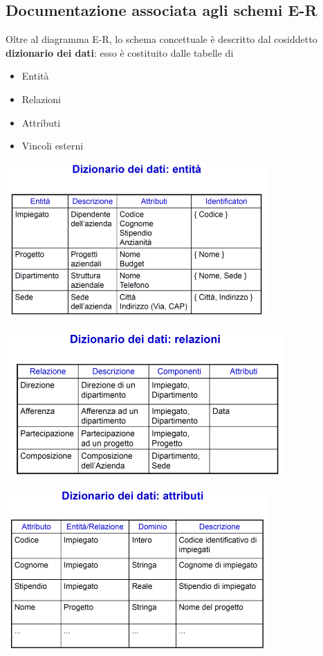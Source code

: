 \documentclass[12pt]{article}
\begin{document}
\subsection{Documentazione associata agli schemi E-R}
Oltre al diagramma E-R, lo schema concettuale è descritto dal cosiddetto \textbf{dizionario dei dati}: esso è costituito dalle tabelle di
\begin{itemize}
    \item Entità
    \item Relazioni 
    \item Attributi 
    \item Vincoli esterni
\end{itemize}
\begin{center}
    \includegraphics[width = 0.75\textwidth]{Images/40.PNG}
\end{center}
\begin{center}
    \includegraphics[width = 0.80\textwidth]{Images/41.PNG}
\end{center}
\begin{center}
    \includegraphics[width = 0.75\textwidth]{Images/42.PNG}
\end{center}
\end{document}
